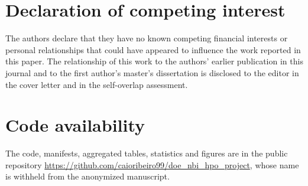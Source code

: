 \documentclass[11pt,a4paper]{article}
\begin{document}
\section*{Declaration of competing interest}
The authors declare that they have no known competing financial interests or personal relationships that could have
appeared to influence the work reported in this paper. The relationship of this work to the authors' earlier
publication in this journal and to the first author's master's dissertation is disclosed to the editor in the cover
letter and in the self-overlap assessment.

\section*{Code availability}
The code, manifests, aggregated tables, statistics and figures are in the public repository
\url{https://github.com/caioribeiro99/doe_nbi_hpo_project}, whose name is withheld from the anonymized
manuscript.
\end{document}
